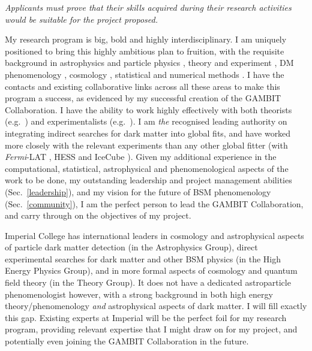 \documentclass[a4paper,11pt]{article}
\newenvironment{xcomment}{\em}{}
\begin{document}
\begin{xcomment}
Applicants must prove that their skills acquired during their research
activities would be suitable for the project proposed.
\end{xcomment}

My research program is big, bold and highly interdisciplinary.  I am uniquely positioned to bring this highly ambitious plan to fruition, with the requisite background in astrophysics \cite{Zackrisson12, Rydberg12, Scott11, Zackrisson10b, Zackrisson10a, AGSS, Scott09Ni, Scott09, Fairbairn08, ScottVII} and particle physics \cite{Cline13b, Cline13, Shandera12, Silverwood12, IC22Methods, Vincent12, Strege12, Bringmann11, Ripken11, Akrami11DD, Akrami11coverage, Akrami09, Scott09c, SS09, Scott09, Fairbairn08}, theory \cite{Cline13b, Cline13, Shandera12, Silverwood12, Vincent12, Strege12, Bringmann11, Scott11, Akrami11DD, Akrami11coverage, Akrami09, SS09, Scott09, Fairbairn08} and experiment \cite{Scott09c, Ripken11, IC22Methods}, DM phenomenology \cite{Cline13b, Cline13, Silverwood12, IC22Methods, Vincent12, Strege12, Bringmann11, Ripken11, Akrami11DD, Akrami11coverage, Scott09c, SS09, Scott09, Fairbairn08}, cosmology \cite{Cline13, Shandera12, Bringmann11, SS09}, statistical and numerical methods \cite{IC22Methods, pippi, Strege12, Akrami11coverage, Akrami09}.  I have the contacts and existing collaborative links across all these areas to make this program a success, as evidenced by my successful creation of the GAMBIT Collaboration.  I have the ability to work highly effectively with both theorists (e.g.\ \cite{Scott09c,Akrami11DD,Bringmann11,Cline13,Cline13b}) and experimentalists (e.g.\ \cite{Scott09c, Ripken11, IC22Methods}).  I am \textit{the} recognised leading authority on integrating indirect searches for dark matter into global fits, and have worked more closely with the relevant experiments than any other global fitter (with \textit{Fermi}-LAT \cite{Scott09c}, HESS \cite{Ripken11} and IceCube \cite{IC22Methods, Silverwood12}).  Given my additional experience in the computational, statistical, astrophysical and phenomenological aspects of the work to be done, my outstanding leadership and project management abilities (Sec.\ \ref{leadership}), and my vision for the future of BSM phenomenology (Sec.\ \ref{community}), I am the perfect person to lead the GAMBIT Collaboration, and carry through on the objectives of my project.

Imperial College has international leaders in cosmology and astrophysical aspects of particle dark matter detection (in the Astrophysics Group), direct experimental searches for dark matter and other BSM physics (in the High Energy Physics Group), and in more formal aspects of cosmology and quantum field theory (in the Theory Group).  It does not have a dedicated astroparticle phenomenologist however, with a strong background in both high energy theory/phenomenology \textit{and} astrophysical aspects of dark matter.  I will fill exactly this gap.  Existing experts at Imperial will be the perfect foil for my research program, providing relevant expertise that I might draw on for my project, and potentially even joining the GAMBIT Collaboration in the future.
\end{document}
